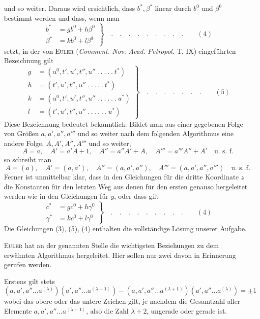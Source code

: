 und so weiter. Daraus wird ersichtlich, dass $b^*,\beta^*$ linear durch $b^0$ und $\beta^0$ bestimmt werden und dass, wenn man
\[
\left.\begin{aligned}
b^*&=gb^0+h\beta^0\\
\beta^*&=kb^0+l\beta^0
\end{aligned}\right\}\quad .\quad .\quad .\quad .\quad .\quad .\quad .\quad .\quad .\qquad (4)
\]
setzt, in der von \textsc{Euler} (\textit{Comment. Nov. Acad. Petropol.} T. IX) eingeführten Bezeichnung gilt
\[
\left.\begin{aligned}
g&=(u^0,t',u',t'',u''\ .\ .\ .\ .\ .\ t^*)\\
h&=(t',u',t'',u''\ .\ .\ .\ .\ .\ t^*)\\
k&=(u^0,t',u',t'',u''\ .\ .\ .\ .\ .\ .\ u^*)\\
l&=(t',u',t'',u''\ .\ .\ .\ .\ .\ .\ u^*)
\end{aligned}\right\}\quad .\quad .\quad .\quad .\quad .\quad .\quad .\qquad (5)
\]
Diese Bezeichnung bedeutet bekanntlich: Bildet man aus einer gegebenen Folge von Größen $a,a',a'',a'''$ und so weiter nach dem folgenden Algorithmus eine andere Folge, $A,A',A'',A'''$ und so weiter,
\[
A=a,\quad A'=a'A+1,\quad A''=a''A'+A,\quad A'''=a'''A''+A'\quad\text{u. s. f.}
\]
so schreibt man
\[
A=(a),\quad A'=(a,a'),\quad A''=(a,a',a''),\quad A'''=(a,a',a'',a''')\quad\text{u. s. f.}
\]
Ferner ist unmittelbar klar, dass in den Gleichungen für die dritte Koordinate $z$ die Konstanten für den letzten Weg aus denen für den ersten genauso hergeleitet werden wie in den Gleichungen für $y$, oder dass gilt
\[
\left.\begin{aligned}
c^*&=gc^0+h\gamma^0\\
\gamma^*&=kc^0+l\gamma^0
\end{aligned}\right\}\quad .\quad .\quad .\quad .\quad .\quad .\quad .\quad .\quad .\qquad (4)
\]
Die Gleichungen (3), (5), (4) enthalten die vollständige Lösung unserer Aufgabe.

\textsc{Euler} hat an der genannten Stelle die wichtigsten Beziehungen zu dem erwähnten Algorithmus hergeleitet. Hier sollen nur zwei davon in Erinnerung gerufen werden.

Erstens gilt stets
\[
(a,a',a''\ldots a^{(\lambda)})(a',a''\ldots a^{(\lambda+1)})-(a,a',a''\ldots a^{(\lambda+1)})(a',a''\ldots a^{(\lambda)})=\pm1
\]
wobei das obere oder das untere Zeichen gilt, je nachdem die Gesamtzahl aller Elemente $a,a',a''\ldots a^{(\lambda+1)}$, also die Zahl $\lambda+2$, ungerade oder gerade ist.


